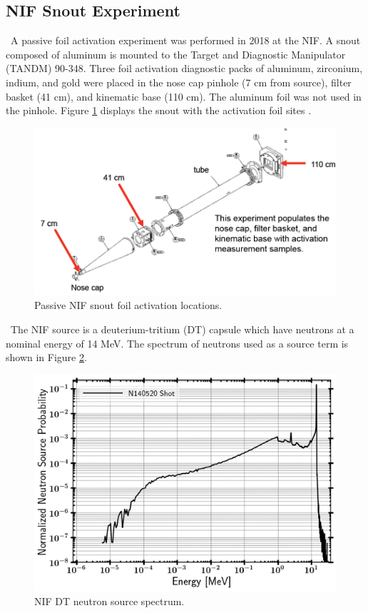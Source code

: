 \documentclass[journal]{IEEEtran}
\let\MYoriglatexcaption\caption
\renewcommand{\caption}[2][\relax]{\MYoriglatexcaption[#2]{#2}}
\begin{document}
	\subsection{NIF Snout Experiment}
	
	\ A passive foil activation experiment was performed in 2018 at the NIF. 
A snout composed of aluminum is mounted to the Target and Diagnostic Manipulator (TANDM) 90-348. 
Three foil activation diagnostic packs of aluminum, zirconium, indium, and gold were placed in the nose cap pinhole (7 cm from source), filter basket (41 cm), and kinematic base (110 cm). 
The aluminum foil was not used in the pinhole. 
Figure \ref{fig:NIF} displays the snout with the activation foil sites \cite{Bogetic}. 
	
	\begin{figure}[h!]
		\includegraphics[width=\linewidth]{Figures/NIF.png}
		\caption{Passive NIF snout foil activation locations.}
		\label{fig:NIF}
	\end{figure}
	
	\ The NIF source is a deuterium-tritium (DT) capsule which have neutrons at a nominal energy of 14 MeV. 
The spectrum of neutrons used as a source term is shown in Figure \ref{fig:NIFSRC}. 
	
	\begin{figure}[h!]
		\includegraphics[width=\linewidth]{Figures/NIFSRC.png}
		\caption{NIF DT neutron source spectrum.}
		\label{fig:NIFSRC}
	\end{figure}
	
\end{document}
